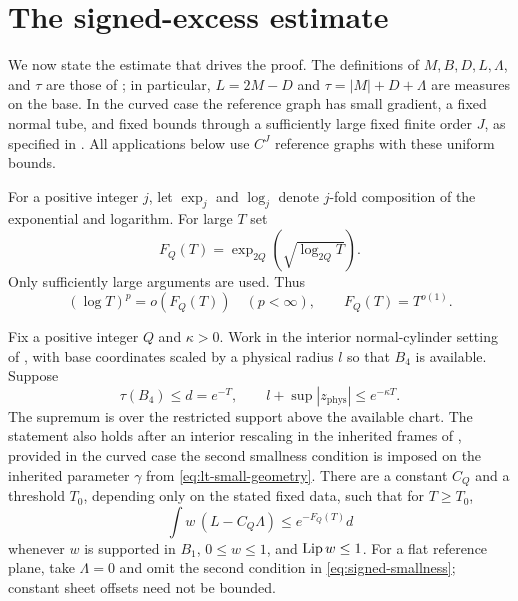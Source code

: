 \section{The signed-excess estimate}\label{sec:signed-statement}

We now state the estimate that drives the proof. The definitions of
$M,B,D,L,\Lambda$, and $\tau$ are those of ; in particular,
$L=2M-D$ and $\tau=|M|+D+\Lambda$ are measures on the base. In the curved case
the reference graph has small gradient, a fixed normal tube, and fixed bounds
through a sufficiently large fixed finite order $J$, as specified in
. All applications below use $C^J$ reference graphs
with these uniform bounds.

For a positive integer $j$, let $\exp_j$ and $\log_j$ denote $j$-fold
composition of the exponential and logarithm. For large $T$ set
\begin{equation}\label{eq:signed-rate}
 F_Q(T)=\exp_{2Q}\!\left(\sqrt{\log_{2Q}T}\right).
\end{equation}
Only sufficiently large arguments are used. Thus
\begin{equation}\label{eq:signed-rate-growth}
 (\log T)^p=o(F_Q(T))\quad(p<\infty),
 \qquad F_Q(T)=T^{o(1)}.
\end{equation}

\begin{theorem}\label{sx:signed}
Fix a positive integer $Q$ and $\kappa>0$. Work in the interior normal-cylinder setting of
, with base coordinates scaled by a physical radius $l$ so
that $B_4$ is available. Suppose
\begin{equation}\label{eq:signed-smallness}
 \tau(B_4)\leq d=e^{-T},
 \qquad l+\sup|z_{\mathrm{phys}}|\leq e^{-\kappa T}.
\end{equation}
The supremum is over the restricted support above the available chart.
The statement also holds after an interior rescaling in the inherited
frames of , provided in the curved case the second
smallness condition is imposed on the inherited parameter $\gamma$ from
\eqref{eq:lt-small-geometry}.
There are a constant $C_Q$ and a threshold $T_0$, depending only on the stated
fixed data, such that for $T\geq T_0$,
\begin{equation}\label{eq:signed-conclusion}
 \int w\,(L-C_Q\Lambda)\leq e^{-F_Q(T)}d
\end{equation}
whenever $w$ is supported in $B_1$, $0\leq w\leq1$, and $\operatorname{Lip} w\leq1$.
For a flat reference plane, take $\Lambda=0$ and omit the second condition
in \eqref{eq:signed-smallness}; constant sheet offsets need not be bounded.
\end{theorem}

